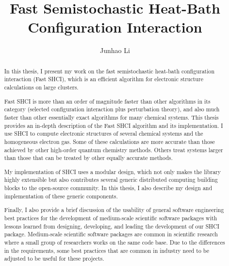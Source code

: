 \documentclass[phd,tocprelim]{cornell}
\title {Fast Semistochastic Heat-Bath Configuration Interaction}
\author {Junhao Li}
\begin{document}
\maketitle
\makecopyright

\begin{abstract}
In this thesis, I present my work on the fast semistochastic heat-bath configuration interaction (Fast SHCI), which is an efficient algorithm for electronic structure calculations on large clusters.

Fast SHCI is more than an order of magnitude faster than other algorithms in its category (selected configuration interaction plus perturbation theory), and also much faster than other essentially exact algorithms for many chemical systems.
This thesis provides an in-depth description of the Fast SHCI algorithm and its implementation. I use SHCI to compute electronic structures of several chemical systems and the homogeneous electron gas.
Some of these calculations are more accurate than those achieved by other high-order quantum chemistry methods.  Others treat systems larger than those that can be treated by other equally accurate methods.

My implementation of SHCI uses a modular design, which not only makes the library highly extensible but also contributes several generic distributed computing building blocks to the open-source community. 
In this thesis, I also describe my design and implementation of these generic components.

Finally, I also provide a brief discussion of the usability of general software engineering best practices for the development of medium-scale scientific software packages with lessons learned from designing, developing, and leading the development of our SHCI package.
Medium-scale scientific software packages are common in scientific research where a small group of researchers works on the same code base.
Due to the differences in the requirements, some best practices that are common in industry need to be adjusted to be useful for these projects.

\end{abstract}
\end{document}
